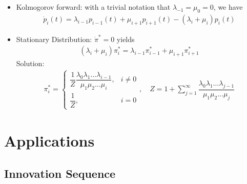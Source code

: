 \begin{itemize}[topsep=2pt,itemsep=0pt]
    \item Kolmogorov forward: with a trivial notation that $ \lambda _{-1}=\mu _0=0 $, we have
    \begin{align}
         \dot{p}_i(t)=\lambda _{i-1}p_{i-1}(t)+\mu _{i+1}p_{i+1}(t)-(\lambda _i+\mu _i)p_i(t)
    \end{align}
    \item Stationary Distribution: $ \dot{\pi}^*=0 $ yields 
    \begin{align}
        (\lambda _i+\mu _i)\pi_i^*=\lambda _{i-1}\pi_{i-1}^*+\mu _{i+1}\pi^*_{i+1} 
    \end{align}
    Solution:
    \begin{align}
        \pi^*_i=\begin{cases}
            \dfrac{1}{Z}\dfrac{\lambda _0\lambda _1\ldots\lambda _{i-1}}{\mu _1\mu _2\ldots\mu _i},&i\neq 0\\
            \dfrac{1}{Z},&i=0
        \end{cases},\quad Z=1+\sum_{j=1}^\infty \dfrac{\lambda _0\lambda _1\ldots\lambda _{j-1}}{\mu _1\mu _2\ldots\mu _j}
    \end{align}
    
\end{itemize}








































\section{Applications}


\subsection{Innovation Sequence}
     
